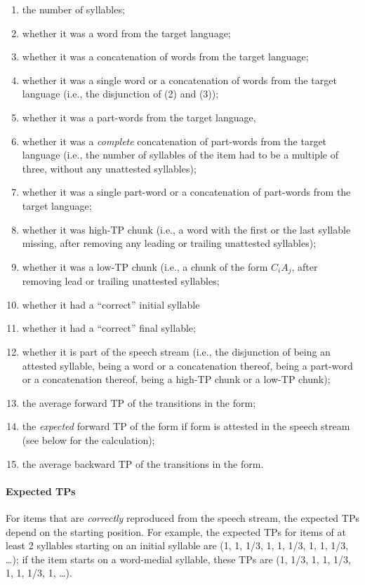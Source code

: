 \documentclass[]{article}
\providecommand{\tightlist}{%
  \setlength{\itemsep}{0pt}\setlength{\parskip}{0pt}}
\let\oldparagraph\paragraph
\renewcommand{\paragraph}[1]{\oldparagraph{#1}\mbox{}}
\begin{document}
\begin{enumerate}
\def\labelenumi{\arabic{enumi}.}
\tightlist
\item
  the number of syllables;
\item
  whether it was a word from the target language;
\item
  whether it was a concatenation of words from the target language;
\item
whether it was a single word or a concatenation of words from the target language (i.e., the disjunction of (2) and (3));
\item
  whether it was a part-words from the target language,
\item
whether it was a \emph{complete} concatenation of part-words from the target language (i.e., the number of syllables of the item had to be a multiple of three, without any unattested syllables);
\item
whether it was a single part-word or a concatenation of part-words from the target language;
\item
whether it was high-TP chunk (i.e., a word with the first or the last syllable missing, after removing any leading or trailing unattested syllables);
\item
  whether it was a low-TP chunk (i.e., a chunk of the form \(C_iA_j\), after removing lead or trailing unattested syllables;
\item
  whether it had a ``correct'' initial syllable
\item
  whether it had a ``correct'' final syllable;
\item
whether it is part of the speech stream (i.e., the disjunction of being an attested syllable, being a word or a concatenation thereof, being a part-word or a concatenation thereof, being a high-TP chunk or a low-TP chunk);
\item
  the average forward TP of the transitions in the form;
\item
the \emph{expected} forward TP of the form if form is attested in the speech stream (see below for the calculation);
\item
  the average backward TP of the transitions in the form.
\end{enumerate}

\paragraph{Expected TPs}\label{expected-tps}

For items that are \emph{correctly} reproduced from the speech stream, the expected TPs depend on the starting position. For example, the expected TPs for items of at least 2 syllables starting on an initial syllable are (1, 1, 1/3, 1, 1, 1/3, 1, 1, 1/3, \ldots{}); if the item starts on a word-medial syllable, these TPs are (1, 1/3, 1, 1, 1/3, 1, 1, 1/3, 1, \ldots{}).
\end{document}
